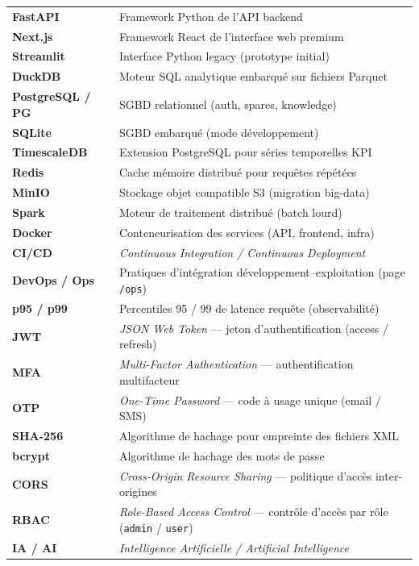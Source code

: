 \documentclass[12pt,a4paper]{report}
\begin{document}
\begin{longtable}{@{}p{3.4cm}p{10.3cm}@{}}
\textbf{FastAPI} & Framework Python de l'API backend \\
\textbf{Next.js} & Framework React de l'interface web premium \\
\textbf{Streamlit} & Interface Python legacy (prototype initial) \\
\textbf{DuckDB} & Moteur SQL analytique embarqué sur fichiers Parquet \\
\textbf{PostgreSQL / PG} & SGBD relationnel (auth, spares, knowledge) \\
\textbf{SQLite} & SGBD embarqué (mode développement) \\
\textbf{TimescaleDB} & Extension PostgreSQL pour séries temporelles KPI \\
\textbf{Redis} & Cache mémoire distribué pour requêtes répétées \\
\textbf{MinIO} & Stockage objet compatible S3 (migration big-data) \\
\textbf{Spark} & Moteur de traitement distribué (batch lourd) \\
\textbf{Docker} & Conteneurisation des services (API, frontend, infra) \\
\textbf{CI/CD} & \textit{Continuous Integration / Continuous Deployment} \\
\textbf{DevOps / Ops} & Pratiques d'intégration développement–exploitation (page \texttt{/ops}) \\
\textbf{p95 / p99} & Percentiles 95 / 99 de latence requête (observabilité) \\
\textbf{JWT} & \textit{JSON Web Token} — jeton d'authentification (access / refresh) \\
\textbf{MFA} & \textit{Multi-Factor Authentication} — authentification multifacteur \\
\textbf{OTP} & \textit{One-Time Password} — code à usage unique (email / SMS) \\
\textbf{SHA-256} & Algorithme de hachage pour empreinte des fichiers XML \\
\textbf{bcrypt} & Algorithme de hachage des mots de passe \\
\textbf{CORS} & \textit{Cross-Origin Resource Sharing} — politique d'accès inter-origines \\
\textbf{RBAC} & \textit{Role-Based Access Control} — contrôle d'accès par rôle (\texttt{admin} / \texttt{user}) \\
\textbf{IA / AI} & \textit{Intelligence Artificielle / Artificial Intelligence} \\

\end{longtable}
\end{document}
